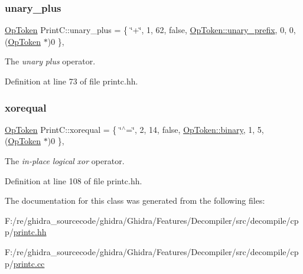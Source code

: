 \subsubsection{\texorpdfstring{unary\_plus}{unary\_plus}}
{\footnotesize\ttfamily \mbox{\hyperlink{class_op_token}{Op\+Token}} Print\+C\+::unary\+\_\+plus = \{ \char`\"{}+\char`\"{}, 1, 62, false, \mbox{\hyperlink{class_op_token_af41c7f108d5662ede7765c5a6c44eaffa0d809c13f66611247b81856fc9e68289}{Op\+Token\+::unary\+\_\+prefix}}, 0, 0, (\mbox{\hyperlink{class_op_token}{Op\+Token}} $\ast$)0 \}\hspace{0.3cm}{\ttfamily [static]}, {\ttfamily [protected]}}



The {\itshape unary} {\itshape plus} operator. 



Definition at line 73 of file printc.\+hh.

\mbox{\label{class_print_c_ab40738c4131f50cbd0f65215ab00c008}} 
\subsubsection{\texorpdfstring{xorequal}{xorequal}}
{\footnotesize\ttfamily \mbox{\hyperlink{class_op_token}{Op\+Token}} Print\+C\+::xorequal = \{ \char`\"{}$^\wedge$=\char`\"{}, 2, 14, false, \mbox{\hyperlink{class_op_token_af41c7f108d5662ede7765c5a6c44eaffa3a2ec63522a9329a71ddbe8adc3e752d}{Op\+Token\+::binary}}, 1, 5, (\mbox{\hyperlink{class_op_token}{Op\+Token}} $\ast$)0 \}\hspace{0.3cm}{\ttfamily [static]}, {\ttfamily [protected]}}



The {\itshape in-\/place} {\itshape logical} {\itshape xor} operator. 



Definition at line 108 of file printc.\+hh.



The documentation for this class was generated from the following files\+:\begin{DoxyCompactItemize}
\item 
F\+:/re/ghidra\+\_\+sourcecode/ghidra/\+Ghidra/\+Features/\+Decompiler/src/decompile/cpp/\mbox{\hyperlink{printc_8hh}{printc.\+hh}}\item 
F\+:/re/ghidra\+\_\+sourcecode/ghidra/\+Ghidra/\+Features/\+Decompiler/src/decompile/cpp/\mbox{\hyperlink{printc_8cc}{printc.\+cc}}\end{DoxyCompactItemize}
